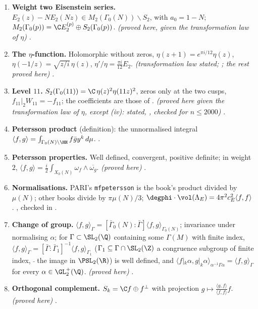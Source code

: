 \begin{enumerate}[label=\textbf{\thechapter.\arabic*}]
\item \textbf{Weight two Eisenstein series.} $E_2(z)-NE_2(Nz)\in M_2(\Gamma_0(N))\smallsetminus S_2$, with $a_0=1-N$; $M_2(\Gamma_0(p))=\C E_2^{(p)}\oplus S_2(\Gamma_0(p))$. \emph{(proved here, given the
transformation law of $\eta$)} .
\item \textbf{The $\eta$-function.} Holomorphic without zeros, $\eta(z+1)=e^{\pi i/12}\eta(z)$, $\eta(-1/z)=\sqrt{z/i}\,\eta(z)$, $\eta'/\eta=\frac{\pi i}{12}E_2$. \emph{(transformation law stated;
\cite{Apostol90}; the rest proved here)} .
\item \textbf{Level $11$.} $S_2(\Gamma_0(11))=\C\,\eta(z)^2\eta(11z)^2$, zeros only at the two cusps, $f_{11}|_2W_{11}=-f_{11}$; the coefficients are those of . \emph{(proved here given
the transformation law of $\eta$, except (iv): stated, , checked for $n\le2000$)} .
\item \textbf{Petersson product} (definition): the unnormalised integral $\langle f,g\rangle=\int_{\Gamma_0(N)\backslash\HH}f\bar gy^k\,d\mu$. .
\item \textbf{Petersson properties.} Well defined, convergent, positive definite; in weight $2$, $\langle f,g\rangle=\frac i2\int_{X_0(N)}\omega_f\wedge\overline{\omega_g}$. \emph{(proved here)} .
\item \textbf{Normalisations.} PARI's \texttt{mfpetersson} is the book's product divided by $\mu(N)$; other books divide by $\pi\mu(N)/3$; $\degphi\cdot\vol(\Lambda_E)=4\pi^2c_E^2\langle f,f\rangle$.
, checked in .
\item \textbf{Change of group.} $\langle f,g\rangle_\Gamma=[\bar\Gamma_0(N):\bar\Gamma]\langle f,g\rangle_{\Gamma_0(N)}$; invariance under normalising $\alpha$; for $\Gamma\subset\SL_2(\Q)$ containing some $\Gamma(M)$ with
finite index, $\langle f,g\rangle_\Gamma=[\bar\Gamma:\bar\Gamma_1]^{-1}\langle f,g\rangle_{\Gamma_1}$ ($\Gamma_1\subseteq\Gamma\cap\SL_2(\Z)$ a congruence subgroup of finite index, $\bar{\ }$ the image in $\PSL_2(\R)$) is
well defined, and $\langle f|_k\alpha,g|_k\alpha\rangle_{\alpha^{-1}\Gamma\alpha}=\langle f,g\rangle_\Gamma$ for every $\alpha\in\GL_2^+(\Q)$. \emph{(proved here)} .
\item \textbf{Orthogonal complement.} $S_k=\C f\oplus f^\perp$ with projection $g\mapsto\frac{\langle g,f\rangle}{\langle f,f\rangle}f$. \emph{(proved here)} .

\end{enumerate}
